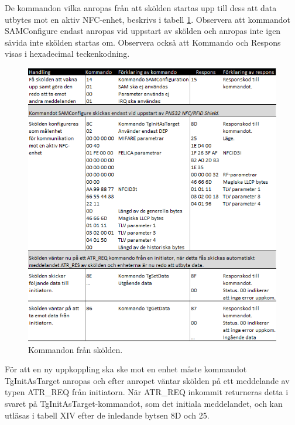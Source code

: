 \documentclass[11pt]{article}
\begin{document}
De kommandon vilka anropas från att skölden startas upp till dess att data utbytes mot en aktiv NFC-enhet, beskrivs i tabell \ref{tab:PN532_kommandon}. Observera att kommandot SAMConfigure endast anropas vid uppstart av skölden och anropas inte igen såvida inte skölden startas om. Observera också att Kommando och Respons visas i hexadecimal teckenkodning.

\begin{figure}[H]
\centering
\includegraphics[scale=0.7]{PN532_kommandon.png}
\caption{Kommandon från skölden.}
\label{tab:PN532_kommandon}
\end{figure}

För att en ny uppkoppling ska ske mot en enhet måste kommandot TgInitAsTarget anropas och efter anropet väntar skölden på ett meddelande av typen ATR\_REQ från initiatorn. När ATR\_REQ inkommit returneras detta i svaret på TgInitAsTarget-kommandot, som det initiala meddelandet, och kan utläsas i tabell XIV efter de inledande bytsen 8D och 25.
\end{document}
